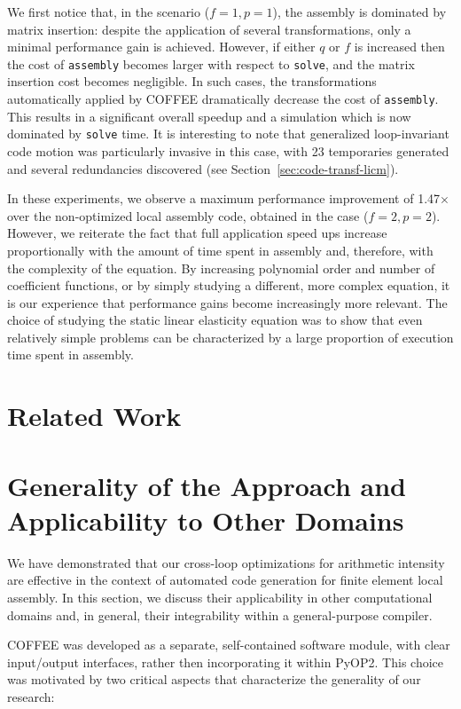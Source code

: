 We first notice that, in the scenario ($f=1, p=1$), the assembly is dominated by matrix insertion: despite the application of several transformations, only a minimal performance gain is achieved. However, if either $q$ or $f$ is increased then the cost of \texttt{assembly} becomes larger with respect to \texttt{solve}, and the matrix insertion cost becomes negligible. In such cases, the transformations automatically applied by COFFEE dramatically decrease the cost of \texttt{assembly}. This results in
a significant overall speedup and a simulation which is now dominated by \texttt{solve} time. It is interesting to note that generalized loop-invariant code motion was particularly invasive in this case, with 23 temporaries generated and several redundancies discovered (see Section~\ref{sec:code-transf-licm}).

In these experiments, we observe a maximum performance improvement of 1.47$\times$ over the non-optimized local assembly code, obtained in the case ($f=2, p=2$). However, we reiterate the fact that full application speed ups increase proportionally with the amount of time spent in assembly and, therefore, with the complexity of the equation. By
increasing polynomial order and number of coefficient functions, or by simply studying a different, more complex equation, it is our experience that performance gains become increasingly more relevant. The choice of studying the static linear elasticity equation was to show that even relatively simple problems can be characterized by a large proportion of execution time spent in assembly. 

\section{Related Work}
\label{sec:coffee-related-work}

\section{Generality of the Approach and Applicability to Other Domains}
\label{sec:generality}
We have demonstrated that our cross-loop optimizations for arithmetic intensity are effective in the context of automated code generation for finite element local assembly. In this section, we discuss their applicability in other computational domains and, in general, their integrability within a general-purpose compiler.

COFFEE was developed as a separate, self-contained software module, with clear input/output interfaces, rather then incorporating it within PyOP2. This choice was motivated by two critical aspects that characterize the generality of our research:

